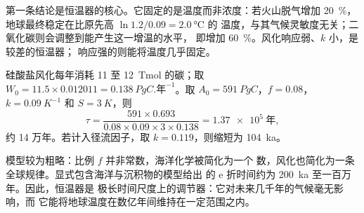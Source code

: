 第一条结论是恒温器的核心。它固定的是温度而非浓度：若火山脱气增加
\qty{20}{\percent}，地球最终稳定在比原先高 $\ln 1.2/0.09 = \qty{2.0}{\celsius}$ 的
温度，与其气候灵敏度无关；二氧化碳则会调整到能产生这一增温的水平，
即增加 \qty{60}{\percent}。风化响应弱、$k$ 小，是较差的恒温器；
响应强的则能将温度几乎固定。

\begin{example}[恒温器的时间常数]\label{ex:b2:deep-time-climate:tau}
硅酸盐风化每年消耗 11 至 \qty{12}{Tmol} 的碳；取 $W_0 = 11.5\times0.012011
= \qty{0.138}{PgC.\text{年}^{-1}}$。取 $A_0 = \qty{591}{PgC}$，$f = 0.08$，$k = \qty{0.09}{K^{-1}}$ 和
$S = \qty{3}{K}$，则
\[
  \tau = \frac{591\times0.693}{0.08\times0.09\times3\times0.138} = \qty{1.37e5}{\text{年}} ,
\]
约 14 万年。若计入径流因子，取 $k = 0.119$，则缩短为
\qty{104}{ka}。
\end{example}

模型较为粗略：比例 $f$ 并非常数，海洋化学被简化为一个
数，风化也简化为一条全球规律。显式包含海洋与沉积物的模型给出
的 e 折时间约为 \qty{200}{ka} 至一百万年。因此，恒温器是
极长时间尺度上的调节器：它对未来几千年的气候毫无影响，而
它能将地球温度在数亿年间维持在一定范围之内。

